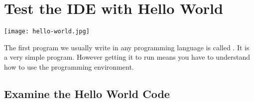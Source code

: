 \section{Test the IDE with Hello World}
\label{sec.hello.world}

\texttt{[image: hello-world.jpg]}

The first program we usually write in any programming language is
called .  It is a very simple program.  However
getting it to run means you have to understand how to use the
programming environment.

\subsection{Examine the Hello World Code}
\label{sec.examine.the.code}
